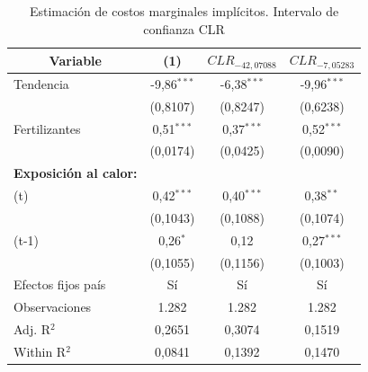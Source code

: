 \scriptsize
\begin{table}\centering

\caption{Estimación de costos marginales implícitos. Intervalo de confianza CLR}
\label{tab:est_cost_clr}

\begin{tabular}{lccc}
\hline 
\hline 
   \multicolumn{1}{c}{\textbf{Variable}} & \textbf{(1)} & \textbf{$CLR_{-42,07088}$} & \textbf{$CLR_{-7,05283}$} \\
   \midrule
   Tendencia      & -9,86$^{***}$ & -6,38$^{***}$ & -9,96$^{***}$ \\
                  & (0,8107)      & (0,8247) & (0,6238) \\
   \addlinespace
   Fertilizantes  & 0,51$^{***}$  & 0,37$^{***}$ & 0,52$^{***}$ \\
                  & (0,0174)      & (0,0425) & (0,0090) \\
   \addlinespace
   \textbf{Exposición al calor:} \\
   \quad (t)      & 0,42$^{***}$  & 0,40$^{***}$ & 0,38$^{**}$ \\
                  & (0,1043)      & (0,1088) & (0,1074) \\
   \quad (t-1)    & 0,26$^{*}$    & 0,12 & 0,27$^{***}$ \\
                  & (0,1055)      & (0,1156) & (0,1003) \\
   \midrule
   Efectos fijos país & Sí & Sí & Sí \\
   Observaciones & 1.282 & 1.282 & 1.282 \\
   Adj. R$^2$ & 0,2651 & 0,3074 & 0,1519 \\
   Within R$^2$ & 0,0841 & 0,1392 & 0,1470 \\
\hline 
\hline 
\end{tabular}
\end{table}
